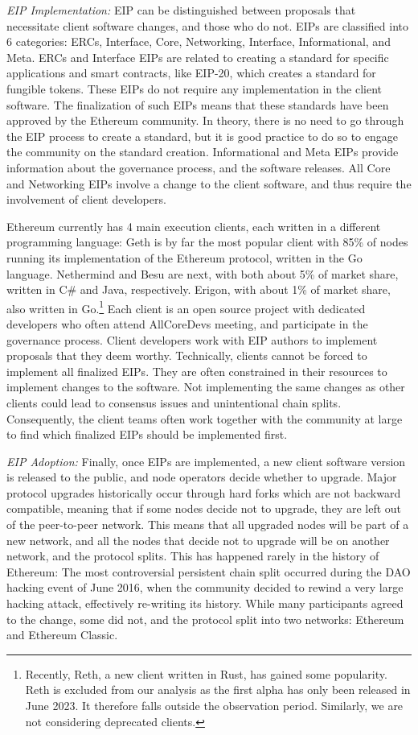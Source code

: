 \documentclass[No]{AEA}
\begin{document}
\textit{EIP Implementation:}  EIP can be distinguished between proposals that necessitate client software changes, and those who do not. EIPs are classified into 6 categories: ERCs, Interface, Core, Networking, Interface, Informational, and Meta. ERCs and Interface EIPs are related to creating a standard for specific applications and smart contracts, like EIP-20, which creates a standard for fungible tokens. These EIPs do not require any implementation in the client software. The finalization of such EIPs means that these standards have been approved by the Ethereum community. In theory, there is no need to go through the EIP process to create a standard, but it is good practice to do so to engage the community on the standard creation. Informational and Meta EIPs provide information about the governance process, and the software releases. All Core and Networking EIPs involve a change to the client software, and thus require the involvement of client developers. 

Ethereum currently has 4 main execution clients, each written in a different programming language: Geth is by far the most popular client with 85\% of nodes running its implementation of the Ethereum protocol, written in the Go language. Nethermind and Besu are next, with both about 5\% of market share, written in C\# and Java, respectively. Erigon, with about 1\% of market share, also written in Go.\footnote{Recently, Reth, a new client written in Rust, has gained some popularity. Reth is excluded from our analysis as the first alpha has only been released in June 2023. It therefore falls outside the observation period. Similarly, we are not considering deprecated clients.} Each client is an open source project with dedicated developers who often attend AllCoreDevs meeting, and participate in the governance process. Client developers work with EIP authors to implement proposals that they deem worthy. Technically, clients cannot be forced to implement all finalized EIPs. They are often constrained in their resources to implement changes to the software. Not implementing the same changes as other clients could lead to consensus issues and unintentional chain splits. Consequently, the client teams often work together with the community at large to find which finalized EIPs should be implemented first.

\textit{EIP Adoption:} Finally, once EIPs are implemented, a new client software version is released to the public, and node operators decide whether to upgrade. Major protocol upgrades historically occur through hard forks which are not backward compatible, meaning that if some nodes decide not to upgrade, they are left out of the peer-to-peer network. This means that all upgraded nodes will be part of a new network, and all the nodes that decide not to upgrade will be on another network, and the protocol splits. This has happened rarely in the history of Ethereum: The most controversial persistent chain split occurred during the DAO hacking event of June 2016, when the community decided to rewind a very large hacking attack, effectively re-writing its history. While many participants agreed to the change, some did not, and the protocol split into two networks: Ethereum and Ethereum Classic. 
\end{document}
